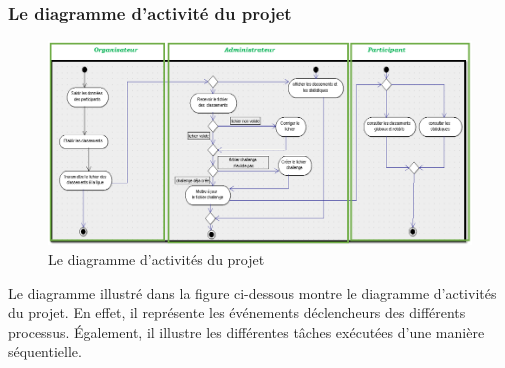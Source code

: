 \subsubsection{Le diagramme d'activité du projet}
\begin{figure}
	   \center
	   \includegraphics[scale=0.9]{Diagramme_activites.png}
	   \caption {Le diagramme d’activités du projet}
\end{figure}

Le diagramme illustré dans la figure ci-dessous montre le diagramme d’activités du projet. En effet, il représente les événements déclencheurs des différents processus. Également, il illustre les différentes tâches exécutées d’une manière séquentielle. 
\newpage

